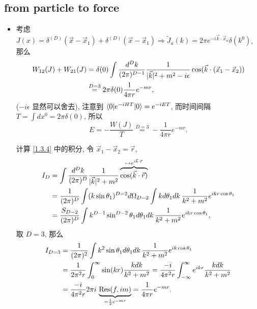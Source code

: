 \subsection{from particle to force}
\begin{itemize}
	\item 考虑 $J(x) = \delta^{(D)}(\vec{x} - \vec{x}_1) + \delta^{(D)}(\vec{x} - \vec{x}_1) \Longrightarrow \tilde{J}_a(k) = 2 \pi e^{- i \vec{k} \cdot \vec{x}_a} \delta(k^0)$, 那么
	\begin{align}
		W_{1 2}(J) + W_{2 1}(J) &= \delta(0) \int \frac{d^D k}{(2 \pi)^{D - 1}} \frac{1}{|\vec{k}|^2 + m^2 - i \epsilon} \cos(\vec{k} \cdot (\vec{x}_1 - \vec{x}_2)) \notag \\
		&\overset{D = 3}{=} 2 \pi \delta(0) \frac{1}{4 \pi r} e^{- m r}, \label{1.3.4}
	\end{align}
	($- i \epsilon$ 显然可以舍去), 注意到 $\braket{0 | e^{- i H T} | 0} = e^{- i E T}$, 而时间间隔 $T = \int dx^0 = 2 \pi \delta(0)$, 所以
	\begin{equation}
		E = - \frac{W(J)}{T} \overset{D = 3}{=} - \frac{1}{4 \pi r} e^{- m r}.
	\end{equation}
	
	\begin{tcolorbox}[title=calculation:]
		计算 \eqref{1.3.4} 中的积分, 令 $\vec{x}_1 - \vec{x}_2 = \vec{r}$,
		\begin{align}
			I_D &= \int \frac{d^D k}{(2 \pi)^D} \frac{1}{|\vec{k}|^2 + m^2} \overbrace{\cos(\vec{k} \cdot \vec{r})}^{\mapsto e^{i \vec{k} \cdot \vec{r}}} \notag \\
			&= \frac{1}{(2 \pi)^D} \int (k \sin \theta_1)^{D - 2} d\Omega_{D - 2} \int k d\theta_1 dk \, \frac{1}{k^2 + m^2} e^{i k r \cos \theta_1} \notag \\
			&= \frac{S_{D - 2}}{(2 \pi)^D} \int k^{D - 1} \sin^{D - 2} \theta_1 d\theta_1 dk \, \frac{1}{k^2 + m^2} e^{i k r \cos \theta_1},
		\end{align}
		取 $D = 3$, 那么
		\begin{align}
			I_{D = 3} &= \frac{1}{(2 \pi)^2} \int k^2 \sin \theta_1 d\theta_1 dk \, \frac{1}{k^2 + m^2} e^{i k \cos \theta_1} \notag \\
			&= \frac{1}{2 \pi^2 r} \int_0^\infty \sin(k r) \frac{k dk}{k^2 + m^2} = \frac{- i}{4 \pi^2 r} \int_{- \infty}^\infty e^{i k r} \frac{k dk}{k^2 + m^2} \notag \\
			&= \frac{- i}{4 \pi^2 r} 2 \pi i \, \underbrace{\mathrm{Res}(f, i m)}_{= \frac{1}{2} e^{- m r}} = \frac{1}{4 \pi r} e^{- m r}.
		\end{align}
	\end{tcolorbox}
\end{itemize}

